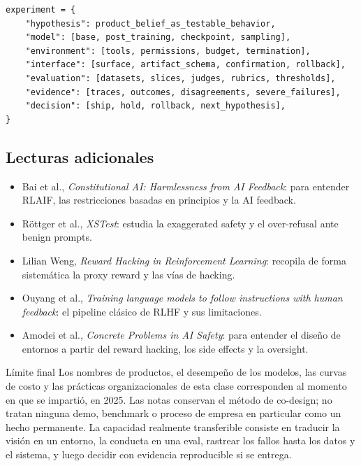 \begin{lstlisting}[caption={Registro reproducible de un experimento de Frontier product}]
experiment = {
    "hypothesis": product_belief_as_testable_behavior,
    "model": [base, post_training, checkpoint, sampling],
    "environment": [tools, permissions, budget, termination],
    "interface": [surface, artifact_schema, confirmation, rollback],
    "evaluation": [datasets, slices, judges, rubrics, thresholds],
    "evidence": [traces, outcomes, disagreements, severe_failures],
    "decision": [ship, hold, rollback, next_hypothesis],
}
\end{lstlisting}

\subsection{Lecturas adicionales}

\begin{itemize}
  \item Bai et al., \emph{Constitutional AI: Harmlessness from AI Feedback}: para entender RLAIF, las restricciones basadas en principios y la AI feedback.
  \item Röttger et al., \emph{XSTest}: estudia la exaggerated safety y el over-refusal ante benign prompts.
  \item Lilian Weng, \emph{Reward Hacking in Reinforcement Learning}: recopila de forma sistemática la proxy reward y las vías de hacking.
  \item Ouyang et al., \emph{Training language models to follow instructions with human feedback}: el pipeline clásico de RLHF y sus limitaciones.
  \item Amodei et al., \emph{Concrete Problems in AI Safety}: para entender el diseño de entornos a partir del reward hacking, los side effects y la oversight.
\end{itemize}

\begin{warningbox}{Límite final}
Los nombres de productos, el desempeño de los modelos, las curvas de costo y las prácticas organizacionales de esta clase corresponden al momento en que se impartió, en 2025. Las notas conservan el método de co-design; no tratan ninguna demo, benchmark o proceso de empresa en particular como un hecho permanente. La capacidad realmente transferible consiste en traducir la visión en un entorno, la conducta en una eval, rastrear los fallos hasta los datos y el sistema, y luego decidir con evidencia reproducible si se entrega.
\end{warningbox}


